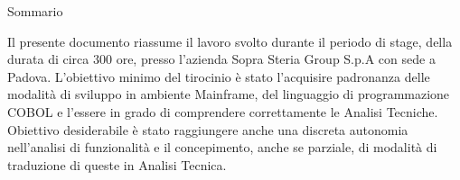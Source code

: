 
\cleardoublepage
{}
{}
\begingroup


\thispagestyle{plain}

\leavevmode	\newline
\leavevmode	\newline
\leavevmode	\newline
\begin{Huge}
Sommario
\end{Huge}
\leavevmode	\newline

Il presente documento riassume il lavoro svolto durante il periodo di stage, della durata di circa 300 ore, presso l’azienda Sopra Steria Group S.p.A con sede a Padova.
L'obiettivo minimo del tirocinio è stato l'acquisire padronanza delle modalità di sviluppo in ambiente Mainframe, del linguaggio di programmazione COBOL e l'essere in grado di comprendere correttamente le Analisi Tecniche.
Obiettivo desiderabile è stato raggiungere anche una discreta autonomia nell'analisi di funzionalità e il concepimento, anche se parziale, di modalità di traduzione di queste in Analisi Tecnica.
\endgroup

\leavevmode	\newline
\leavevmode	\newline
\leavevmode	\newline

